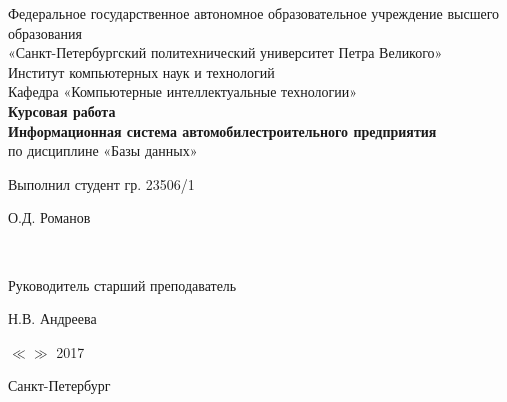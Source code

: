 \begin{titlepage}

	\begin{center}

		\large Федеральное государственное автономное образовательное учреждение высшего образования \\
		\large «Санкт-Петербургский политехнический университет Петра Великого» \\
		\large Институт компьютерных наук и технологий \\
		\large Кафедра «Компьютерные интеллектуальные технологии» \\[6cm]

		\huge {\bf Курсовая работа} \\[0.5cm]
		\large {\bf Информационная система автомобилестроительного предприятия} \\[0.1cm]
		\large по дисциплине «Базы данных» \\[6cm]

	\end{center}

    \begin{center}
        \begin{minipage}[t]{4cm}
            \begin{flushleft}
                Выполнил
                студент гр. 23506/1
            \end{flushleft}
        \end{minipage}
        \hfill
        \begin{minipage}[t]{4cm}
            \begin{flushright}
            О.Д. Романов
            \end{flushright}
        \end{minipage} \\[0.5cm]

        \begin{minipage}[t]{4cm}
            \begin{flushleft}
                Руководитель
                старший преподаватель
            \end{flushleft}
            \flushleft
        \end{minipage}
        \hfill
        \begin{minipage}[t]{4cm}
            \begin{flushright}
                Н.В. Андреева
            \end{flushright}
        \end{minipage}
    \end{center}

    \begin{flushright}
        $\ll$\underline{\hspace{0.5cm}}$\gg$ \underline{\hspace{1.5cm}} 2017
    \end{flushright}

	
	\vfill

	\begin{center}
	    \large Санкт-Петербург\\
	    \large \the\year
	\end{center}
 
\end{titlepage}